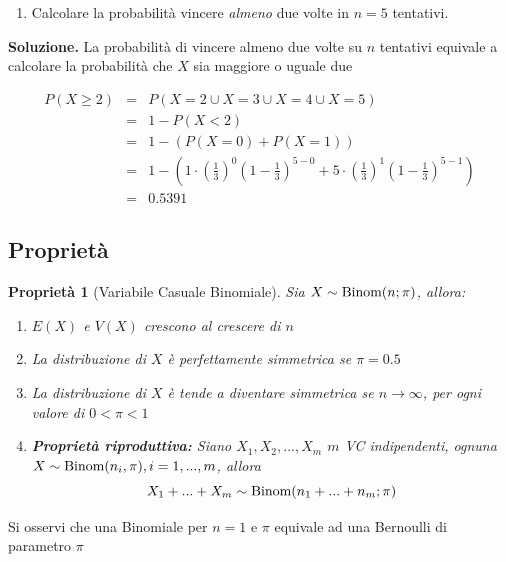 \documentclass[
  11pt,
]{book}
\providecommand{\tightlist}{%
  \setlength{\itemsep}{0pt}\setlength{\parskip}{0pt}}
\theoremstyle{mytheoremstyle}
\newtheorem{proposition}{Proprietà}[section]
\theoremstyle{mydefstyle}
\begin{document}
\begin{enumerate}
\def\labelenumi{\arabic{enumi}.}
\setcounter{enumi}{2}
\tightlist
\item
  Calcolare la probabilità vincere \emph{almeno} due volte in \(n=5\) tentativi.
\end{enumerate}

\textbf{Soluzione.}
La probabilità di vincere almeno due volte su \(n\) tentativi equivale a calcolare la probabilità che \(X\) sia maggiore o uguale due

\begin{eqnarray*}
P(X\geq 2) &=& P(X=2 \cup X=3 \cup X=4 \cup X=5)\\
           &=& 1-P(X<2)\\
           &=& 1-(P(X=0)+P(X=1))\\
           &=& 1-\left(1\cdot \left(\frac 1 3\right)^0\left(1-\frac 1 3\right)^{5-0} +5\cdot \left(\frac 1 3\right)^1\left(1-\frac 1 3\right)^{5-1} \right)\\
           &=& 0.5391
\end{eqnarray*}

\subsection{Proprietà}\label{proprietuxe0}

\begin{proposition}[Variabile Casuale Binomiale]

Sia \(X\sim\text{\rm Binom}(n;\pi)\), allora:

\begin{enumerate}
\def\labelenumi{\arabic{enumi}.}
\tightlist
\item
  \(E(X)\) e \(V(X)\) crescono al crescere di \(n\)
\item
  La distribuzione di \(X\) è perfettamente simmetrica se \(\pi=0.5\)
\item
  La distribuzione di \(X\) è tende a diventare simmetrica se \(n\to\infty\), per ogni valore di \(0<\pi<1\)
\item
  \textbf{Proprietà riproduttiva:}
  Siano \(X_1,X_2,...,X_m\) \(m\) VC indipendenti, ognuna \(X\sim\text{\rm Binom}(n_i,\pi), i =1,...,m\), allora
  \[X_1+...+X_m\sim\text{\rm Binom}(n_1+...+n_m;\pi)\]
\end{enumerate}

\end{proposition}

Si osservi che una Binomiale per \(n=1\) e \(\pi\) equivale ad una Bernoulli di
parametro \(\pi\)
\end{document}

